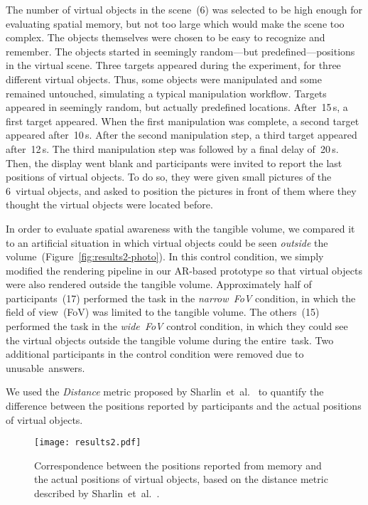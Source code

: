 \documentclass{vgtc}                         \havecopyrightspacefalse
\begin{document}
The number of virtual objects in the scene~(6) was selected to be high enough for evaluating spatial memory, but not too large which would make the scene too complex. The objects themselves were chosen to be easy to recognize and remember. The objects started in seemingly random---but predefined---positions in the virtual scene. Three targets appeared during the experiment, for three different virtual objects. Thus, some objects were manipulated and some remained untouched, simulating a typical manipulation workflow. Targets appeared in seemingly random, but actually predefined locations. After~15\,s, a first target appeared. When the first manipulation was complete, a second target appeared after~10\,s. After the second manipulation step, a third target appeared after~12\,s. The third manipulation step was followed by a final delay of~20\,s. Then, the display went blank and participants were invited to report the last positions of virtual objects. To do so, they were given small pictures of the 6~virtual objects, and asked to position the pictures in front of them where they thought the virtual objects were located before.

In order to evaluate spatial awareness with the tangible volume, we compared it to an artificial situation in which virtual objects could be seen \emph{outside} the volume~(Figure~\ref{fig:results2-photo}). In this control condition, we simply modified the rendering pipeline in our AR-based prototype so that virtual objects were also rendered outside the tangible volume. Approximately half of participants~(17) performed the task in the \emph{narrow~FoV} condition, in which the field of view~(FoV) was limited to the tangible volume. The others~(15) performed the task in the \emph{wide~FoV} control condition, in which they could see the virtual objects outside the tangible volume during the entire~task. Two additional participants in the control condition were removed due to unusable~answers.

We used the \emph{Distance} metric proposed by Sharlin~et~al.~\cite{sharlin09} to quantify the difference between the positions reported by participants and the actual positions of virtual objects.

\begin{figure}[t]
  \centering
  \texttt{[image: results2.pdf]}
  \caption{Correspondence between the positions reported from memory and the actual positions of virtual objects, based on the distance metric described by Sharlin~et~al.~\protect\cite{sharlin09}.}
  \label{fig:results2}
\end{figure}
\end{document}
